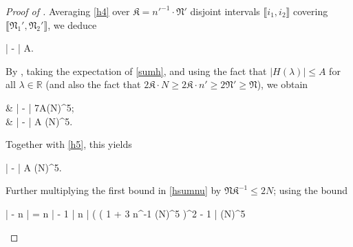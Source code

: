 \documentclass{amsart}
\numberwithin{equation}{section}
\DeclareMathOperator{\eig}{eig}
\DeclareMathOperator{\Imaginary}{Im}
\theoremstyle{remark}
\theoremstyle{definition}
\begin{document}
\begin{proof}[Proof of ]
		Averaging \eqref{h4} over $\mathfrak{K} = n'^{-1} \cdot \mathfrak{N}'$ disjoint intervals $\llbracket i_1, i_2 \rrbracket$ covering $\llbracket \mathfrak{N}_1', \mathfrak{N}_2' \rrbracket$, we deduce
		\begin{flalign}
			\label{h5} 
			\begin{aligned} 
				\Bigg|  \bigg[ \displaystyle\frac{1}{\mathfrak{K}} \displaystyle\int_{-\log N}^{\log N} H(E) \displaystyle\sum_{i=\mathfrak{N}_1'}^{\mathfrak{N}_2'} \Imaginary \mathfrak{G}_{ii} (E + \mathrm{i} \eta) dE \bigg] -  \bigg[ \displaystyle\int_{-\log N}^{\log N} H(E) \displaystyle\sum_{i=n_1'}^{n_2'} \Imaginary G_{ii} (E + \mathrm{i} \eta) dE \bigg] \Bigg| \le A. 
			\end{aligned}  
		\end{flalign}
		
		\noindent By , taking the expectation of \eqref{sumh}, and using the fact that $| H(\lambda) | \le A$ for all $\lambda \in \mathbb{R}$ (and also the fact that $2 \mathfrak{K} \cdot N \ge 2 \mathfrak{K} \cdot n' \ge 2 \mathfrak{N}' \ge \mathfrak{N}$), we obtain
		\begin{flalign*}
			& \Bigg|  \bigg[ \displaystyle\sum_{i=n_1}^{n_2} H(\Lambda_i) \bigg] -  \bigg[ \displaystyle\frac{1}{\pi} \displaystyle\int_{-\log N}^{\log N} H(E) \displaystyle\sum_{i=n_1'}^{n_2'} \Imaginary G_{ii} (E + \mathrm{i} \eta) dE \bigg] \Bigg| \le 7A(\log N)^5; \\
			& \Bigg|  \bigg[ \displaystyle\frac{1}{\mathfrak{K}} \displaystyle\sum_{\nu \in \eig \bm{\mathfrak{L}}} H(\nu) \bigg] -  \bigg[ \displaystyle\frac{1}{\mathfrak{K} \pi} \displaystyle\int_{-\log N}^{\log N} H(E) \displaystyle\sum_{i=\mathfrak{N}_1'}^{\mathfrak{N}_2'} \Imaginary \mathfrak{G}_{ii} (E + \mathrm{i} \eta) d E \bigg] \Bigg|  A (\log N)^5.
		\end{flalign*}
		
		\noindent Together with \eqref{h5}, this yields 
		\begin{flalign}
			\label{h6}
			\Bigg|  \bigg[ \displaystyle\sum_{i=n_1}^{n_2} H(\Lambda_i) \bigg] -  \bigg[ \displaystyle\frac{1}{\mathfrak{K}} \displaystyle\sum_{\nu \in \eig \bm{\mathfrak{L}}} H(\nu) \bigg] \Bigg|  A (\log N)^5.
		\end{flalign}
		
		\noindent Further multiplying the first bound in \eqref{hsumnu} by $\mathfrak{N} \mathfrak{K}^{-1} \le 2N$; using the bound
		\begin{flalign*} 
			\bigg| \displaystyle{} - n \bigg| = n \cdot \bigg| \displaystyle{} \cdot \displaystyle{} - 1 \bigg| \le n \cdot \big| \big( ( 1 + 3 n^{-1} (\log N)^5 \big)^2 - 1 \big|  (\log N)^5
		\end{flalign*}
		

\end{proof}
\end{document}

